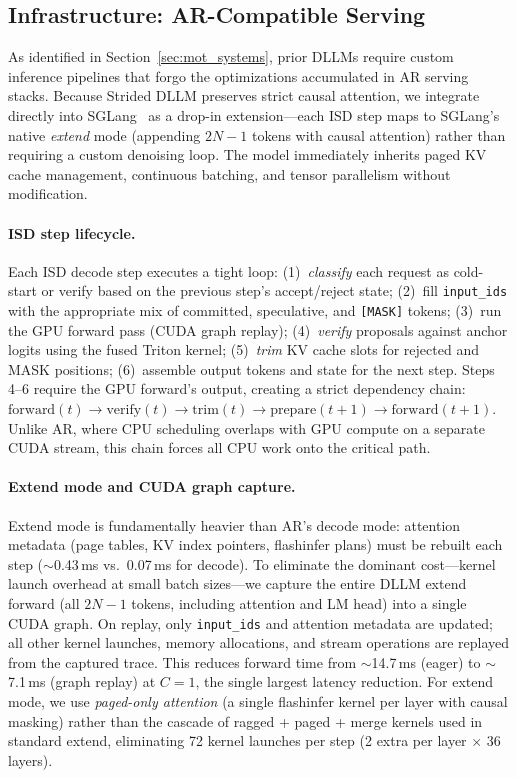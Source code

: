 \subsection{Infrastructure: AR-Compatible Serving}
\label{sec:infra}

As identified in Section~\ref{sec:mot_systems}, prior DLLMs require custom inference pipelines that forgo the optimizations accumulated in AR serving stacks. Because Strided DLLM preserves strict causal attention, we integrate directly into SGLang~\citep{zheng2024sglang} as a drop-in extension---each ISD step maps to SGLang's native \emph{extend} mode (appending $2N{-}1$ tokens with causal attention) rather than requiring a custom denoising loop. The model immediately inherits paged KV cache management, continuous batching, and tensor parallelism without modification.

\paragraph{ISD step lifecycle.}
Each ISD decode step executes a tight loop: (1)~\emph{classify} each request as cold-start or verify based on the previous step's accept/reject state; (2)~fill \texttt{input\_ids} with the appropriate mix of committed, speculative, and \texttt{[MASK]} tokens; (3)~run the GPU forward pass (CUDA graph replay); (4)~\emph{verify} proposals against anchor logits using the fused Triton kernel; (5)~\emph{trim} KV cache slots for rejected and MASK positions; (6)~assemble output tokens and state for the next step. Steps 4--6 require the GPU forward's output, creating a strict dependency chain: $\text{forward}(t) \to \text{verify}(t) \to \text{trim}(t) \to \text{prepare}(t{+}1) \to \text{forward}(t{+}1)$. Unlike AR, where CPU scheduling overlaps with GPU compute on a separate CUDA stream, this chain forces all CPU work onto the critical path.

\paragraph{Extend mode and CUDA graph capture.}
Extend mode is fundamentally heavier than AR's decode mode: attention metadata (page tables, KV index pointers, flashinfer plans) must be rebuilt each step (${\sim}$0.43\,ms vs.\ 0.07\,ms for decode). To eliminate the dominant cost---kernel launch overhead at small batch sizes---we capture the entire DLLM extend forward (all $2N{-}1$ tokens, including attention and LM head) into a single CUDA graph. On replay, only \texttt{input\_ids} and attention metadata are updated; all other kernel launches, memory allocations, and stream operations are replayed from the captured trace. This reduces forward time from ${\sim}$14.7\,ms (eager) to ${\sim}$7.1\,ms (graph replay) at $C{=}1$, the single largest latency reduction. For extend mode, we use \emph{paged-only attention} (a single flashinfer kernel per layer with causal masking) rather than the cascade of ragged + paged + merge kernels used in standard extend, eliminating 72 kernel launches per step (2 extra per layer $\times$ 36 layers).

